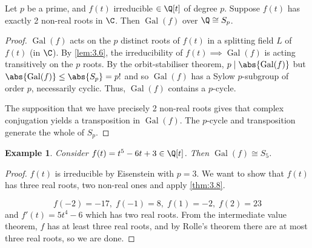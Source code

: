 \documentclass{article}
\DeclareMathOperator{\Gal}{Gal}
\newtheorem{nexample}[nthm]{Example}
\begin{document}
\begin{nthm}\label{thm:3.8}
    Let $p$ be a prime, and $f(t)$ irreducible $\in \Q[t]$ of degree $p$.
    Suppose $f(t)$ has exactly 2 non-real roots in $\C$.
    Then $\Gal(f)$ over $\Q \cong S_p$.
\end{nthm}

\begin{proof}
    $\Gal(f)$ acts on the $p$ distinct roots of $f(t)$ in a splitting field $L$ of $f(t)$ (in $\C$).
    By \cref{lem:3.6}, the irreducibility of $f(t) \implies \Gal(f)$ is acting transitively on the $p$ roots.
    By the orbit-stabiliser theorem, $p \mid \abs{\Gal(f)}$ but $\abs{\Gal(f)} \leq \abs{S_p} = p!$ and so $\Gal(f)$ has a Sylow $p$-subgroup of order $p$, necessarily cyclic.
    Thus, $\Gal(f)$ contains a $p$-cycle.

    The supposition that we have precisely 2 non-real roots gives that complex conjugation yields a transposition in $\Gal(f)$.
    The $p$-cycle and transposition generate the whole of $S_p$.
\end{proof}

\begin{nexample}\label{eg:3.9}
    Consider $f(t) = t^5 - 6t + 3 \in \Q[t]$. Then $\Gal(f) \cong S_5$.
\end{nexample}

\begin{proof}
    $f(t)$ is irreducible by Eisenstein with $p=3$.
    We want to show that $f(t)$ has three real roots, two non-real ones and apply \cref{thm:3.8}.

    \begin{equation*}
        f(-2) = -17, \; f(-1) = 8, \; f(1) = -2, \; f(2) = 23
    \end{equation*}
    and $f'(t) = 5t^4 - 6$ which has two real roots.
    From the intermediate value theorem, $f$ has at least three real roots, and by Rolle's theorem there are at most three real roots, so we are done.
\end{proof}

\end{document}
